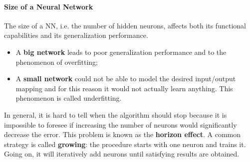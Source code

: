 \paragraph*{Size of a Neural Network} 
The size of a NN, i.e. the number of hidden neurons, affects both its functional capabilities and its generalization performance.
\begin{itemize}
	\item A \textbf{big network} leads to poor generalization performance and to the phenomenon of overfitting;
	\item A \textbf{small network} could not be able to model the desired input/output mapping and for this reason it would not actually learn anything. This phenomenon is called underfitting.
\end{itemize}

In general, it is hard to tell when the algorithm should stop because it is impossible to foresee if increasing the number of neurons would significantly decrease the error. This problem is known as the \textbf{horizon effect}. A common strategy is called \textbf{growing}: the procedure starts with one neuron and trains it. Going on, it will iteratively add neurons until satisfying results are obtained.
